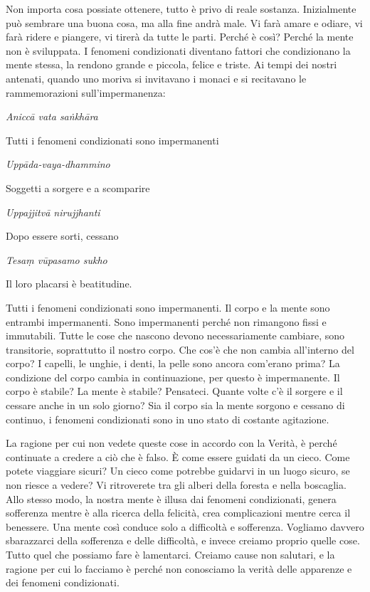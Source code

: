 Non importa cosa possiate ottenere, tutto è privo di reale sostanza.
Inizialmente può sembrare una buona cosa, ma alla fine andrà male. Vi
farà amare e odiare, vi farà ridere e piangere, vi tirerà da tutte le
parti. Perché è così? Perché la mente non è sviluppata. I fenomeni
condizionati diventano fattori che condizionano la mente stessa, la
rendono grande e piccola, felice e triste. Ai tempi dei nostri antenati,
quando uno moriva si invitavano i monaci e si recitavano le
rammemorazioni sull'impermanenza:

\emph{Aniccā vata saṅkhāra}

Tutti i fenomeni condizionati sono impermanenti

\emph{Uppāda-vaya-dhammino}

Soggetti a sorgere e a scomparire

\emph{Uppajjitvā nirujjhanti}

Dopo essere sorti, cessano

\emph{Tesaṃ vūpasamo sukho}

Il loro placarsi è beatitudine.

Tutti i fenomeni condizionati sono impermanenti. Il corpo e la mente
sono entrambi impermanenti. Sono impermanenti perché non rimangono fissi
e immutabili. Tutte le cose che nascono devono necessariamente cambiare,
sono transitorie, soprattutto il nostro corpo. Che cos'è che non cambia
all'interno del corpo? I capelli, le unghie, i denti, la pelle sono
ancora com'erano prima? La condizione del corpo cambia in continuazione,
per questo è impermanente. Il corpo è stabile? La mente è stabile?
Pensateci. Quante volte c'è il sorgere e il cessare anche in un solo
giorno? Sia il corpo sia la mente sorgono e cessano di continuo, i
fenomeni condizionati sono in uno stato di costante agitazione.

La ragione per cui non vedete queste cose in accordo con la Verità, è
perché continuate a credere a ciò che è falso. È come essere guidati da
un cieco. Come potete viaggiare sicuri? Un cieco come potrebbe guidarvi
in un luogo sicuro, se non riesce a vedere? Vi ritroverete tra gli
alberi della foresta e nella boscaglia. Allo stesso modo, la nostra
mente è illusa dai fenomeni condizionati, genera sofferenza mentre è
alla ricerca della felicità, crea complicazioni mentre cerca il
benessere. Una mente così conduce solo a difficoltà e sofferenza.
Vogliamo davvero sbarazzarci della sofferenza e delle difficoltà, e
invece creiamo proprio quelle cose. Tutto quel che possiamo fare è
lamentarci. Creiamo cause non salutari, e la ragione per cui lo facciamo
è perché non conosciamo la verità delle apparenze e dei fenomeni
condizionati.

